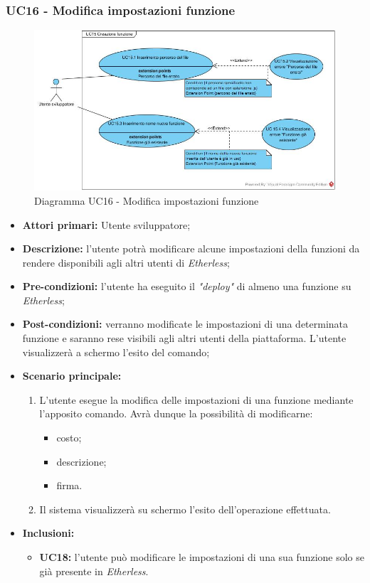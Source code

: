 \subsubsection{UC16 - Modifica impostazioni funzione}
\begin{figure}[h]
	\centering
	\includegraphics[width=\linewidth]{res/img/UC15.jpg}
	\caption{Diagramma UC16 - Modifica impostazioni funzione}
\end{figure}
\begin{itemize}
	\item \textbf{Attori primari:} Utente sviluppatore;
	\item \textbf{Descrizione:} l'utente potrà modificare alcune impostazioni della funzioni da rendere disponibili agli altri utenti di \textit{Etherless}; 
	\item \textbf{Pre-condizioni:} l'utente ha eseguito il \textit{"deploy\glos"} di almeno una funzione su \textit{Etherless};
	\item \textbf{Post-condizioni:} verranno modificate le impostazioni di una determinata funzione e saranno rese visibili agli altri utenti della piattaforma. L'utente visualizzerà a schermo l'esito del comando;
	\item \textbf{Scenario principale:} 
	\begin{enumerate}
		\item L'utente esegue la modifica delle impostazioni di una funzione mediante l'apposito comando. Avrà dunque la possibilità di modificarne:
		\begin{itemize}
			\item costo;
			\item descrizione;
			\item firma.
		\end{itemize}
		\item Il sistema visualizzerà su schermo l'esito dell'operazione effettuata.
	\end{enumerate}
	\item \textbf{Inclusioni:} 
	\begin{itemize}
		\item \textbf{UC18:} l'utente può modificare le impostazioni di una sua funzione solo se già presente in \textit{Etherless}.
	\end{itemize}	
\end{itemize}